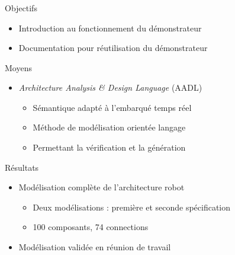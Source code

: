 \documentclass{beamer}
\begin{document}
      \begin{frame}
        \frametitle{\secname}        
        \framesubtitle{\subsecname}
 
        \begin{block}{Objectifs}
          \begin{itemize}
            \item Introduction au fonctionnement du démonstrateur 
            \item Documentation pour réutilisation du démonstrateur
          \end{itemize}
        \end{block}
          
        \pause
        \begin{block}{Moyens}
          \begin{itemize}
            \item {\footnotesize\cite{aadl}} {\it Architecture Analysis \&
              Design Language} (AADL)
              \begin{itemize}
                \item Sémantique adapté à l'embarqué temps réel
                \item Méthode de modélisation orientée langage
                \item Permettant la vérification et la génération
              \end{itemize}
          \end{itemize}
        \end{block}

        \pause
        \begin{block}{Résultats}
          \begin{itemize}
            \item Modélisation complète de l'architecture robot
              \begin{itemize}
                \item Deux modélisations : première et seconde spécification
                \item 100 composants, 74 connections
              \end{itemize}
            \item Modélisation validée en réunion de travail
          \end{itemize}
        \end{block}
      \end{frame}
\end{document}
